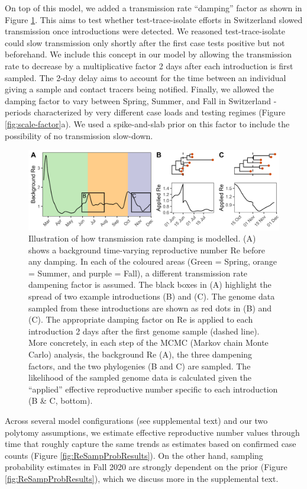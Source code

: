 \documentclass[9pt,twoside,lineno]{pnas-new} %
\begin{document}
On top of this model, we added a transmission rate ``damping'' factor as shown in Figure \ref{fig:phylo-methods}. This aims to test whether test-trace-isolate efforts in Switzerland slowed transmission once introductions were detected. We reasoned test-trace-isolate could slow transmission only shortly after the first case tests positive but not beforehand. We include this concept in our model by allowing the transmission rate to decrease by a multiplicative factor 2 days after each introduction is first sampled. The 2-day delay aims to account for the time between an individual giving a sample and contact tracers being notified. Finally, we allowed the damping factor to vary between Spring, Summer, and Fall in Switzerland - periods characterized by very different case loads and testing regimes (Figure \ref{fig:scale-factor}a). We used a spike-and-slab prior on this factor to include the possibility of no transmission slow-down. 

\begin{figure}[h!]
\centering
\includegraphics[width=0.75\linewidth]{figures/phylodynamic_method_example.png}
\caption{Illustration of how transmission rate damping is modelled. (A) shows a background time-varying reproductive number Re before any damping. In each of the coloured areas (Green = Spring, orange = Summer, and purple = Fall), a different transmission rate dampening factor is assumed. The black boxes in (A) highlight the spread of two example introductions (B) and (C). The genome data sampled from these introductions are shown as red dots in (B) and (C). The appropriate damping factor on Re is applied to each introduction 2 days after the first genome sample (dashed line). More concretely, in each step of the MCMC (Markov chain Monte Carlo) analysis, the background Re (A), the three dampening factors, and the two phylogenies (B and C) are sampled. The likelihood of the sampled genome data is calculated given the ``applied'' effective reproductive number specific to each introduction (B \& C, bottom).}  
\label{fig:phylo-methods}
\end{figure}

Across several model configurations (see supplemental text) and our two polytomy assumptions, we estimate effective reproductive number values through time that roughly capture the same trends as estimates based on confirmed case counts (Figure \ref{fig:ReSampProbResults}). On the other hand, sampling probability estimates in Fall 2020 are strongly dependent on the prior (Figure \ref{fig:ReSampProbResults}), which we discuss more in the supplemental text.
\end{document}
